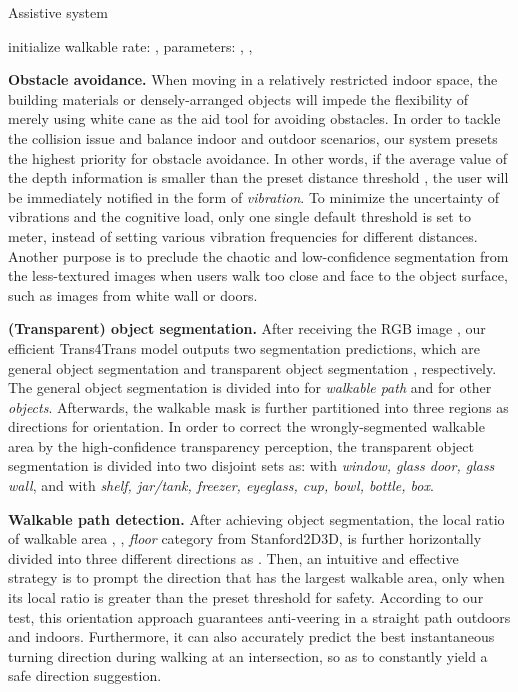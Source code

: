 \documentclass[10pt,twocolumn,letterpaper]{article}
\begin{document}
\begin{algorithm}[!t]
	\caption{Assistive system}
\label{algo:system}
    initialize walkable rate: , parameters: , ,  \;
\end{algorithm}
\noindent\textbf{Obstacle avoidance.}
When moving in a relatively restricted indoor space, the building materials or densely-arranged objects will impede the flexibility of merely using white cane as the aid tool for avoiding obstacles. In order to tackle the collision issue and balance indoor and outdoor scenarios, our system presets the highest priority for obstacle avoidance. In other words, if the average value of the depth information is smaller than the preset distance threshold , the user will be immediately notified in the form of \emph{vibration}. To minimize the uncertainty of vibrations and the cognitive load, only one single default threshold is set to  meter, instead of setting various vibration frequencies for different distances. Another purpose is to preclude the chaotic and low-confidence segmentation from the less-textured images when users walk too close and face to the object surface, such as images from white wall or doors.

\noindent\textbf{(Transparent) object segmentation.}
After receiving the RGB image , our efficient Trans4Trans model outputs two segmentation predictions, which are general object segmentation  and transparent object segmentation , respectively. The general object segmentation is divided into  for \emph{walkable path} and  for other \emph{objects}. Afterwards, the walkable mask is further partitioned into three regions as  directions for orientation. In order to correct the wrongly-segmented walkable area by the high-confidence transparency perception, the transparent object segmentation is divided into two disjoint sets as:  with \emph{window, glass door, glass wall}, and  with \emph{shelf, jar/tank, freezer, eyeglass, cup, bowl, bottle, box}.

\noindent\textbf{Walkable path detection.}
After achieving object segmentation, the local ratio of walkable area , \eg, \emph{floor} category from Stanford2D3D, is further horizontally divided into three different directions as . Then, an intuitive and effective strategy is to prompt the direction that has the largest walkable area, only when its local ratio is greater than the preset threshold  for safety. According to our test, this orientation approach guarantees anti-veering in a straight path outdoors and indoors. Furthermore, it can also accurately predict the best instantaneous turning direction during walking at an intersection, so as to constantly yield a safe direction suggestion.
\end{document}
